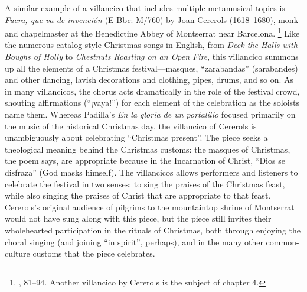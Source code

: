 \documentclass[oneside,12pt]{book}
\begin{document}
      A similar example of a villancico that includes multiple metamusical topics is \emph{Fuera, que va de invención} (E-Bbc: M/760) by Joan Cererols (1618–1680), monk and chapelmaster at the Benedictine Abbey of Montserrat near Barcelona.%
\footnote{\autocite{Cererols1932}, 81–94.
	Another villancico by Cererols is the subject of chapter 4.
	}
      Like the numerous catalog-style Christmas songs in English, from \emph{Deck the Halls with Boughs of Holly} to \emph{Chestnuts Roasting on an Open Fire}, this villancico summons up all the elements of a Christmas festival—masques, \enquote{zarabandas} (sarabandes) and other dancing, lavish decorations and clothing, pipes, drums, and so on.
      As in many villancicos, the chorus acts dramatically in the role of the festival crowd, shouting affirmations (\enquote{¡vaya!}) for each element of the celebration as the soloists name them.
      Whereas Padilla’s \emph{En la gloria de un portalillo} focused primarily on the music of the historical Christmas day, the villancico of Cererols is unambiguously about celebrating \enquote{Christmas present}.
      The piece seeks a theological meaning behind the Christmas customs: the masques of Christmas, the poem says, are appropriate because in the Incarnation of Christ, \enquote{Dios se disfraza} (God masks himself).
      The villancicos allows performers and listeners to celebrate the festival in two senses: to sing the praises of the Christmas feast, while also singing the praises of Christ that are appropriate to that feast.
      Cererols’s original audience of pilgrims to the mountaintop shrine of Montserrat would not have sung along with this piece, but the piece still invites their wholehearted participation in the rituals of Christmas, both through enjoying the choral singing (and joining \enquote{in spirit}, perhaps), and in the many other common-culture customs that the piece celebrates.
    
\printbibliography
\end{document}
